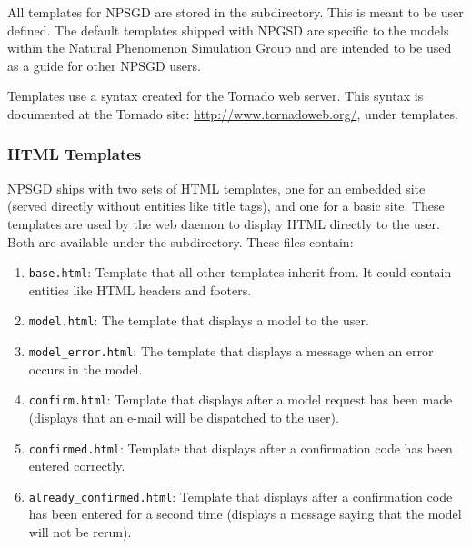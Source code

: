 \documentclass{article}
\begin{document}
All templates for NPSGD are stored in the  subdirectory. This
is meant to be user defined. The default templates shipped with NPGSD are 
specific to the models within the Natural Phenomenon Simulation Group and are
intended to be used as a guide for other NPSGD users.

Templates use a syntax created for the Tornado web server. This syntax is
documented at the Tornado site: \url{http://www.tornadoweb.org/}, under
templates.

\subsubsection{HTML Templates}
NPSGD ships with two sets of HTML templates, one for an embedded site (served
directly without entities like title tags), and one for a basic site. These
templates are used by the web daemon to display HTML directly to the user. Both are
available under the  subdirectory. These files contain:
\begin{enumerate}
    \item \texttt{base.html}: Template that all other templates inherit from.
    It could contain entities like HTML headers and footers.

    \item \texttt{model.html}: The template that displays a model to the user.

    \item \texttt{model\_error.html}: The template that displays a message when
    an error occurs in the model.

    \item \texttt{confirm.html}: Template that displays after a model request has
    been made (displays that an e-mail will be dispatched to the user).

    \item \texttt{confirmed.html}: Template that displays after a confirmation code
    has been entered correctly.

    \item \texttt{already\_confirmed.html}: Template that displays after a
    confirmation code has been entered for a second time (displays a
    message saying that the model will not be rerun).
\end{enumerate}
\end{document}
